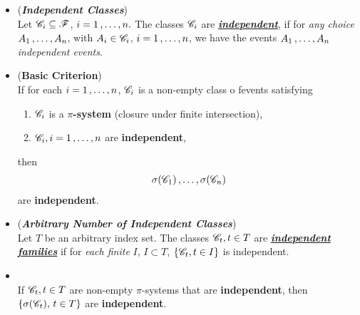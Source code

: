 \documentclass[11pt]{article}
\begin{document}
\begin{itemize}
\item \begin{definition} (\emph{\textbf{Independent Classes}})\\
Let ${\mathscr C}_i \subseteq {\mathscr F}$, $i = 1 \,{,}\ldots{,}\, n.$ The classes ${\mathscr C}_i$ are  \underline{\emph{\textbf{independent}}}, if for \emph{any choice} $A_1 \,{,}\ldots{,}\, A_n$, with $A_i \in {\mathscr C}_i$, $i = 1 \,{,}\ldots{,}\, n$, we have the events $A_1 \,{,}\ldots{,}\, A_n$ \emph{independent events}.
\end{definition}

\item \begin{proposition} (\textbf{Basic Criterion}) \citep{resnick2013probability}\\
If for each $i = 1 \,{,}\ldots{,}\, n$, ${\mathscr C}_i$ is a non-empty class o fevents satisfying
\begin{enumerate}
\item ${\mathscr C}_i$ is a \textbf{$\pi$-system} (closure under finite intersection),
\item ${\mathscr C}_i, i = 1 \,{,}\ldots{,}\, n$ are \textbf{independent},
\end{enumerate}
then
\begin{align*}
\sigma({\mathscr C}_1) \,{,}\ldots{,}\, \sigma({\mathscr C}_n)
\end{align*} are \textbf{independent}.
\end{proposition}

\item \begin{definition} (\textbf{\emph{Arbitrary Number of Independent Classes}}) \\
Let $T$ be an arbitrary index set. The classes ${\mathscr C}_t, t \in T$ are \underline{\emph{\textbf{independent families}}} if for \emph{each finite} $I$, $I \subset T$,
$\{{\mathscr C}_t, t \in I\}$ is independent.
\end{definition}

\item \begin{corollary} \citep{resnick2013probability}\\
If ${\mathscr C}_t, t \in T$ are non-empty $\pi$-systems that are \textbf{independent}, then $\{\sigma({\mathscr C}_t),\, t \in T\}$ are \textbf{independent}.
\end{corollary}
\end{itemize}
\end{document}
